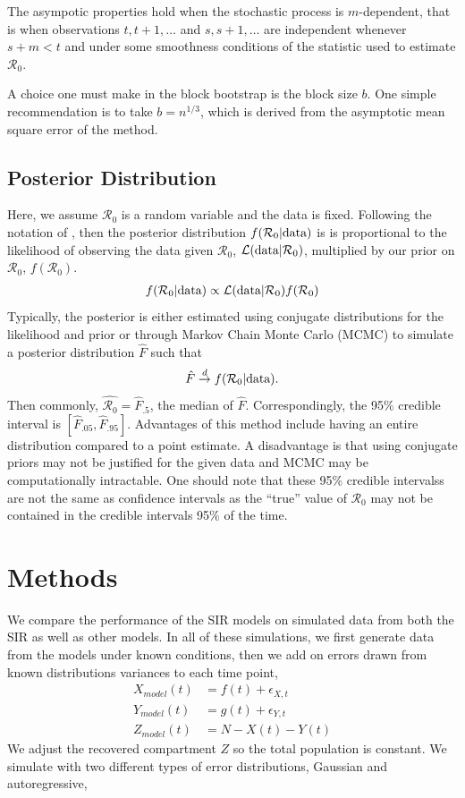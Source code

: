 \documentclass[12pt]{article}
\newcommand{\rr}{\ensuremath{\mathcal{R}_0}}
\begin{document}
The asympotic properties hold when the stochastic process is $m$-dependent, that is when observations $t, t+1, \dots$ and $s, s+1, \dots$ are independent whenever $s+m < t$ and under some smoothness conditions of the statistic used to estimate $\rr$.

A choice one must make in the block bootstrap is the block size $b$.  One simple recommendation is to take $b= n^{1/3}$, which is derived from the asymptotic mean square error of the method.


\subsection{Posterior Distribution}
Here, we assume $\rr$ is a random variable and the data is fixed.  Following the notation of \cite{wasserman2004}, then the posterior distribution $f(\rr | \textnormal{data})$ is is proportional to the likelihood of observing the data given $\rr$, $\mathcal{L}(\textnormal{data}|\rr)$, multiplied by our prior on $\rr$, $f(\rr)$. 
\begin{align*}
f(\rr | \textnormal{data} ) \propto \mathcal{L}(\textnormal{data} | \rr) f(\rr)
\end{align*}
 Typically, the posterior is either estimated using conjugate distributions for the likelihood and prior or through Markov Chain Monte Carlo (MCMC) to simulate a posterior distribution $\hat{F}$ such that
\begin{align*}
\hat{F} \overset{d}{\to} f(\rr| \textnormal{data}).
\end{align*}
Then commonly, $\hat{\rr} = \hat{F}_{.5}$, the median of $\hat{F}$.  Correspondingly, the 95\% credible interval is $\left[\hat{F}_{.05}, \hat{F}_{.95} \right ]$. Advantages of this method include having an entire distribution compared to a point estimate.  A disadvantage is that using conjugate priors may not be justified for the given data and MCMC may be computationally intractable.  One should note that these 95\% credible intervalss are not the same as confidence intervals as the ``true'' value of $\rr$ may not be contained in the credible intervals 95\% of the time.





\section{Methods}\label{sec:sim-res}

We compare the performance of the SIR models on simulated data from both the SIR as well as other models. In all of these simulations, we first generate data from the models under known conditions, then we add on errors drawn from known distributions variances to each time point,
\begin{align}\label{eq:sim-models}
  X_{model}(t) &= f(t) + \epsilon_{X,t} \\
  Y_{model}(t) &= g(t) + \epsilon_{Y,t} \nonumber\\
  Z_{model}(t) &= N - X(t) - Y(t)\nonumber 
\end{align}
We adjust the recovered compartment $Z$ so the total population is constant. 
We simulate with two different types of error distributions, Gaussian and autoregressive,
\end{document}
